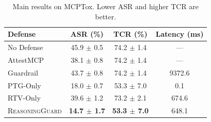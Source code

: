 \begin{table}[t]
\centering
\small
\begin{tabular}{lccc}
\toprule
Defense & ASR (\%) & TCR (\%) & Latency (ms) \\
\midrule
No Defense & 45.9 $\pm$ 0.5 & 74.2 $\pm$ 1.4 & --- \\
AttestMCP & 38.1 $\pm$ 0.8 & 74.2 $\pm$ 1.4 & --- \\
Guardrail & 43.7 $\pm$ 0.8 & 74.2 $\pm$ 1.4 & 9372.6 \\
PTG-Only & 18.0 $\pm$ 0.7 & 53.3 $\pm$ 7.0 & 0.1 \\
RTV-Only & 39.6 $\pm$ 1.2 & 73.2 $\pm$ 2.1 & 674.6 \\
\textsc{ReasoningGuard} & \textbf{14.7 $\pm$ 1.7} & \textbf{53.3 $\pm$ 7.0} & 648.1 \\
\bottomrule
\end{tabular}
\caption{Main results on MCPTox. Lower ASR and higher TCR are better.}
\label{tab:main}
\end{table}
